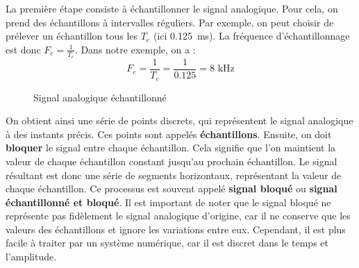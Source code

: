 La première étape consiste à échantillonner le signal analogique. Pour cela, on
prend des échantillons à intervalles réguliers. Par exemple, on peut choisir de
prélever un échantillon tous les \(T_e\) (ici \SI{0.125}{\ms}). La fréquence
d'échantillonnage est donc \(F_e=\frac{1}{T_e}\). Dans notre exemple, on a :
\[
    F_e = \frac{1}{T_e} = \frac{1}{0.125} = 8 \text{ kHz}
\]
\begin{figure}[H]
    \centering
    \caption{Signal analogique échantillonné}
    \label{fig:signal-echantillonne}
\end{figure}

On obtient ainsi une série de points discrets, qui représentent le signal
analogique à des instants précis. Ces points sont appelés \textbf{échantillons}.
Ensuite, on doit \textbf{bloquer} le signal entre chaque échantillon. Cela signifie
que l'on maintient la valeur de chaque échantillon constant jusqu'au prochain
échantillon. Le signal résultant est donc une série de segments horizontaux,
représentant la valeur de chaque échantillon. Ce processus est souvent appelé
\textbf{signal bloqué} ou \textbf{signal échantillonné et bloqué}. Il est important
de noter que le signal bloqué ne représente pas fidèlement le signal analogique
d'origine, car il ne conserve que les valeurs des échantillons et ignore les
variations entre eux. Cependant, il est plus facile à traiter par un système
numérique, car il est discret dans le temps et l'amplitude.

